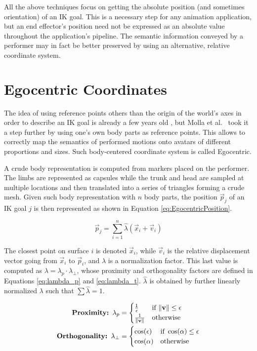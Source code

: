 All the above techniques focus on getting the absolute position (and sometimes orientation) of an IK goal. This is a necessary step for any animation application, but an end effector's position need not be expressed as an absolute value throughout the application's pipeline. The semantic information conveyed by a performer may in fact be better preserved by using an alternative, relative coordinate system.

\section{Egocentric Coordinates}
\label{sec:egocentric}

The idea of using reference points others than the origin of the world's axes in order to describe an IK goal is already a few years old \cite{al2013relationship}, but Molla et al.\ \cite{molla2017egocentric,molla2016precise} took it a step further by using one's own body parts as reference points. This allows to correctly map the semantics of performed motions onto avatars of different proportions and sizes. Such body-centered coordinate system is called Egocentric.

A crude body representation is computed from markers placed on the performer. The limbs are represented as capsules while the trunk and head are sampled at multiple locations and then translated into a series of triangles forming a crude mesh. Given such body representation with $n$ body parts, the position $\vec{p}_j$ of an IK goal $j$ is then represented as shown in Equation \ref{eq:EgocentricPosition}.

\begin{equation}
\label{eq:EgocentricPosition}
\vec{p}_j = \displaystyle\sum_{i=1}^{n} \hat{\lambda}(\vec{x}_i + \vec{v}_i)
\end{equation}

The closest point on surface $i$ is denoted $\vec{x}_i$, while $\vec{v}_i$ is the relative displacement vector going from $\vec{x}_i$ to $\vec{p}_i$, and $\lambda $ is a normalization factor. This last value is computed as $\lambda = \lambda_p \cdot \lambda_\perp$, whose proximity and orthogonality factors are defined in Equations \ref{eq:lambda_p} and \ref{eq:lambda_t}. $\hat{\lambda}$ is obtained by further linearly normalized $\lambda$ such that $\sum \hat{\lambda} = 1$.

\begin{align}
    \label{eq:lambda_p}
    \textbf{Proximity: } \lambda_p &=
    \begin{cases}
        \frac{1}{\epsilon}          &\text{if } \lVert\mathbf{v}\rVert \leq \epsilon\\
        \frac{1}{\lVert\mathbf{v}\rVert}    &\text{otherwise}
    \end{cases}
    \\
    \label{eq:lambda_t}
    \textbf{Orthogonality: } \lambda_\perp &=
    \begin{cases}
        \cos(\epsilon)      &\text{if } \cos(\alpha) \leq \epsilon\\
        \cos(\alpha)        &\text{otherwise}
    \end{cases}
\end{align}

